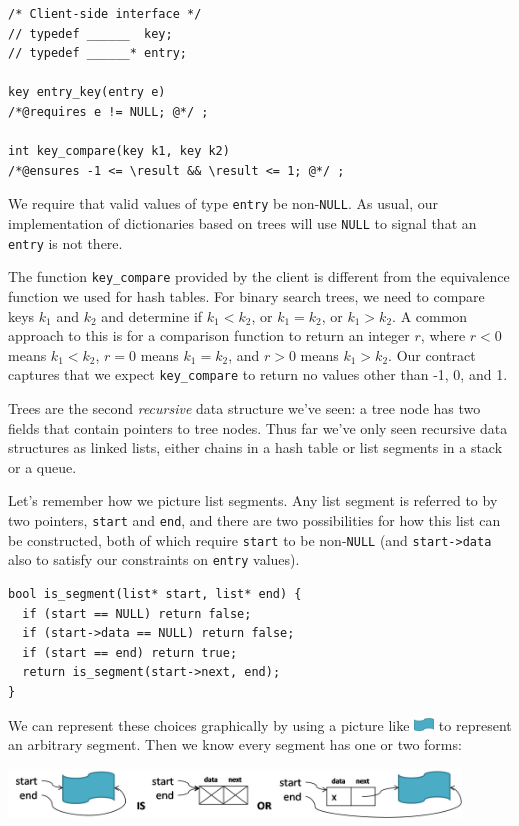 \begin{lstlisting}[language={[C0]C}]
/* Client-side interface */
// typedef ______  key;
// typedef ______* entry;

key entry_key(entry e)
/*@requires e != NULL; @*/ ;

int key_compare(key k1, key k2)
/*@ensures -1 <= \result && \result <= 1; @*/ ;
\end{lstlisting}
We require that valid values of type \lstinline'entry' be
non-\lstinline'NULL'.  As usual, our implementation of dictionaries
based on trees will use \lstinline'NULL' to signal that an
\lstinline'entry' is not there.

The function \lstinline'key_compare' provided by the client is different
from the equivalence function we used for hash tables.  For binary
search trees, we need to compare keys $k_1$ and $k_2$ and
determine if $k_1 < k_2$, or $k_1 = k_2$, or $k_1 > k_2$.  A common
approach to this is for a comparison function to return an integer
$r$, where $r < 0$ means $k_1 < k_2$, $r = 0$ means $k_1 = k_2$, and
$r > 0$ means $k_1 > k_2$.  Our contract captures that we expect
\lstinline'key_compare' to return no values other than -1, 0, and 1.

Trees are the second \emph{recursive} data structure we've seen: a tree
node has two fields that contain pointers to tree nodes. Thus far
we've only seen recursive data structures as linked lists, either
chains in a hash table or list segments in a stack or a queue.

Let's remember how we picture list segments. Any list segment is referred to
by two pointers, \lstinline'start' and \lstinline'end', and there are two
possibilities for how this list can be constructed, both of which require
\lstinline'start' to be non-\lstinline'NULL' (and \lstinline'start->data' also
to satisfy our constraints on \lstinline'entry' values).
\begin{lstlisting}[language={[C0]C}]
bool is_segment(list* start, list* end) {
  if (start == NULL) return false;
  if (start->data == NULL) return false;
  if (start == end) return true;
  return is_segment(start->next, end);
}
\end{lstlisting}
We can represent these choices graphically by using a picture like
\includegraphics[width=0.04\textwidth]{img/segment-pic.png}
to represent an arbitrary segment. Then we know every segment has one or two
forms:
\begin{center}
  \includegraphics[width=0.9\textwidth]{img/segment-cases.png}
\end{center}

